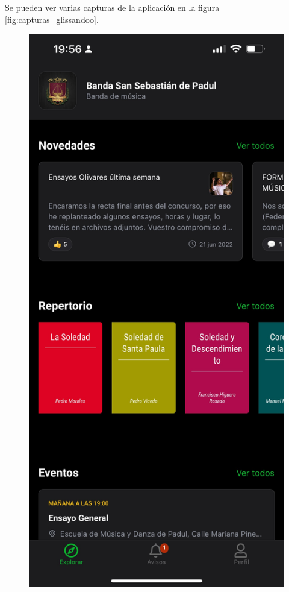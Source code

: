 Se pueden ver varias capturas de la aplicación en la figura \ref{fig:capturas_glissandoo}.
\begin{figure}[h]
  \includegraphics[width=\linewidth]{imagenes/capturas_glissandoo/IMG_0928.jpeg}

\end{figure}
